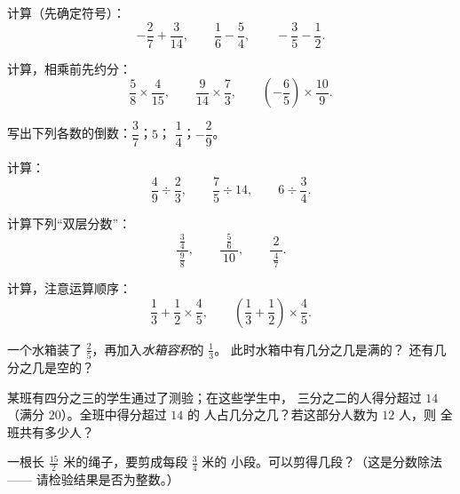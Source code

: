 \begin{exercise}[$\star$]\label{exo:g8:fractions:2}
计算（先确定符号）：
\[
-\frac{2}{7} + \frac{3}{14}, \qquad
\frac{1}{6} - \frac{5}{4}, \qquad
-\frac{3}{5} - \frac{1}{2} .
\]
\end{exercise}

\begin{exercise}[$\star$]\label{exo:g8:fractions:3}
计算，相乘前先约分：
\[
\frac{5}{8} \times \frac{4}{15}, \qquad
\frac{9}{14} \times \frac{7}{3}, \qquad
\left(-\frac{6}{5}\right) \times \frac{10}{9} .
\]
\end{exercise}

\begin{exercise}[$\star$]\label{exo:g8:fractions:4}
写出下列各数的倒数：$\dfrac{3}{7}$；\quad $5$；\quad
$\dfrac{1}{4}$；\quad $-\dfrac{2}{9}$。
\end{exercise}

\begin{exercise}[$\star$]\label{exo:g8:fractions:5}
计算：
\[
\frac{4}{9} \div \frac{2}{3}, \qquad
\frac{7}{5} \div 14, \qquad
6 \div \frac{3}{4} .
\]
\end{exercise}

\begin{exercise}[$\star$]\label{exo:g8:fractions:6}
计算下列“双层分数”：
\[
\frac{\ \frac{3}{4}\ }{\ \frac{9}{8}\ },
\qquad
\frac{\ \frac{5}{6}\ }{\ 10\ },
\qquad
\frac{\ 2\ }{\ \frac{4}{7}\ } .
\]
\end{exercise}

\begin{exercise}[$\star$]\label{exo:g8:fractions:7}
计算，注意运算顺序：
\[
\frac{1}{3} + \frac{1}{2} \times \frac{4}{5},
\qquad
\left(\frac{1}{3} + \frac{1}{2}\right) \times \frac{4}{5} .
\]
\end{exercise}

\begin{exercise}[$\star\star$]\label{exo:g8:fractions:8}
一个水箱装了 $\frac{2}{5}$，再加入\emph{水箱容积}的 $\frac{1}{3}$。
此时水箱中有几分之几是满的？
还有几分之几是空的？
\end{exercise}

\begin{exercise}[$\star\star$]\label{exo:g8:fractions:9}
某班有四分之三的学生通过了测验；在这些学生中，
三分之二的人得分超过 $14$（满分 $20$）。全班中得分超过 $14$ 的
人占几分之几？若这部分人数为 $12$ 人，则
全班共有多少人？
\end{exercise}

\begin{exercise}[$\star\star$]\label{exo:g8:fractions:10}
一根长 $\frac{15}{2}$ 米的绳子，要剪成每段 $\frac{3}{4}$ 米的
小段。可以剪得几段？（这是分数除法——
请检验结果是否为整数。）
\end{exercise}

